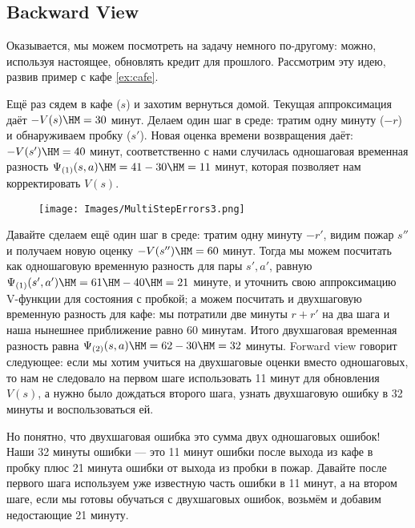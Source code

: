 \subsection{Backward View}

Оказывается, мы можем посмотреть на задачу немного по-другому: можно, используя настоящее, обновлять кредит для прошлого. Рассмотрим эту идею, развив пример с кафе \ref{ex:cafe}. 

\begin{example}
Ещё раз сядем в кафе ($s$) и захотим вернуться домой. Текущая аппроксимация даёт $-V(s) \HM= 30$ минут. Делаем один шаг в среде: тратим одну минуту ($-r$) и обнаруживаем пробку ($s'$). Новая оценка времени возвращения даёт: $-V(s') \HM= 40$ минут, соответственно с нами случилась одношаговая временная разность $\Psi_{(1)}(s, a) \HM= 41 - 30 \HM= 11$ минут, которая позволяет нам корректировать $V(s)$.

\begin{wrapfigure}{r}{0.3\textwidth}
\vspace{-0.3cm}
\centering
\texttt{[image: Images/MultiStepErrors3.png]}
\vspace{-0.3cm}
\end{wrapfigure}

Давайте сделаем ещё один шаг в среде: тратим одну минуту $-r'$, видим пожар $s''$ и получаем новую оценку $-V(s'') \HM= 60$ минут. Тогда мы можем посчитать как одношаговую временную разность для пары $s', a'$, равную $\Psi_{(1)}(s', a') \HM= 61 \HM- 40 \HM= 21$ минуте, и уточнить свою аппроксимацию V-функции для состояния с пробкой; а можем посчитать и двухшаговую временную разность для кафе: мы потратили две минуты $r + r'$ на два шага и наша нынешнее приближение равно 60 минутам. Итого двухшаговая временная разность равна $\Psi_{(2)}(s, a) \HM= 62 - 30 \HM= 32$ минуты. Forward view говорит следующее: если мы хотим учиться на двухшаговые оценки вместо одношаговых, то нам не следовало на первом шаге использовать 11 минут для обновления $V(s)$, а нужно было дождаться второго шага, узнать двухшаговую ошибку в 32 минуты и воспользоваться ей.

Но понятно, что двухшаговая ошибка это сумма двух одношаговых ошибок! Наши 32 минуты ошибки --- это 11 минут ошибки после выхода из кафе в пробку плюс 21 минута ошибки от выхода из пробки в пожар. Давайте после первого шага используем уже известную часть ошибки в 11 минут, а на втором шаге, если мы готовы обучаться с двухшаговых ошибок, возьмём и добавим недостающие 21 минуту.
\end{example}

